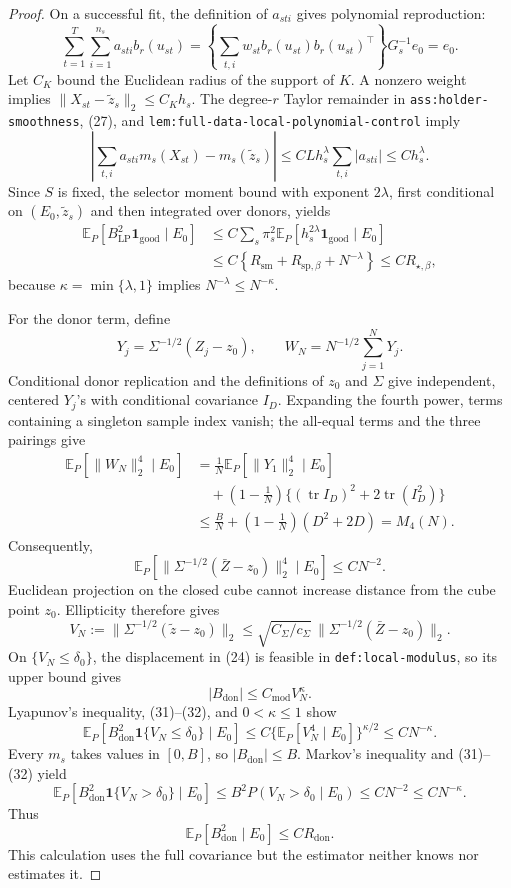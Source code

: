 \documentclass{article}
\begin{document}
\begin{proof}
On a successful fit, the definition of \(a_{sti}\) gives polynomial reproduction:
\[
\sum_{t=1}^{T}\sum_{i=1}^{n_s}a_{sti}b_r(u_{st})
=\left\{\sum_{t,i}w_{st}b_r(u_{st})b_r(u_{st})^\top\right\}G_s^{-1}e_0
=e_0.
\tag{27}
\]
Let \(C_K\) bound the Euclidean radius of the support of \(K\).  A nonzero weight implies
\(\|X_{st}-\widetilde z_s\|_2\leq C_Kh_s\).  The degree-\(r\) Taylor remainder in \texttt{ass:holder-smoothness}, (27), and \texttt{lem:full-data-local-polynomial-control} imply
\[
\left|\sum_{t,i}a_{sti}m_s(X_{st})-m_s(\widetilde z_s)\right|
\leq CLh_s^\lambda\sum_{t,i}|a_{sti}|
\leq Ch_s^\lambda.
\tag{28}
\]
Since \(S\) is fixed, the selector moment bound with exponent \(2\lambda\), first conditional on \((E_0,\widetilde z_s)\) and then integrated over donors, yields
\[
\begin{aligned}
\mathbb E_P[B_{\mathrm{LP}}^2\mathbf1_{\mathrm{good}}\mid E_0]
&\leq C\sum_s\pi_s^2
\mathbb E_P[h_s^{2\lambda}\mathbf1_{\mathrm{good}}\mid E_0]\\
&\leq C\left\{
R_{\mathrm{sm}}+R_{\mathrm{sp},\beta}+N^{-\lambda}\right\}
\leq CR_{\star,\beta},
\end{aligned}
\tag{29}
\]
because \(\kappa=\min\{\lambda,1\}\) implies \(N^{-\lambda}\leq N^{-\kappa}\).

For the donor term, define
\[
Y_j=\Sigma^{-1/2}(Z_j-z_0),
\qquad
W_N=N^{-1/2}\sum_{j=1}^{N}Y_j.
\]
Conditional donor replication and the definitions of \(z_0\) and \(\Sigma\) give independent, centered \(Y_j\)'s with conditional covariance \(I_D\).  Expanding the fourth power, terms containing a singleton sample index vanish; the all-equal terms and the three pairings give
\[
\begin{aligned}
\mathbb E_P[\|W_N\|_2^4\mid E_0]
&=\frac1N\mathbb E_P[\|Y_1\|_2^4\mid E_0]\\
&\quad+\left(1-\frac1N\right)
\{(\operatorname{tr}I_D)^2+2\operatorname{tr}(I_D^2)\}\\
&\leq\frac BN+\left(1-\frac1N\right)(D^2+2D)=M_4(N).
\end{aligned}
\tag{30}
\]
Consequently,
\[
\mathbb E_P[\|\Sigma^{-1/2}(\bar Z-z_0)\|_2^4\mid E_0]
\leq CN^{-2}.
\tag{31}
\]
Euclidean projection on the closed cube cannot increase distance from the cube point \(z_0\).  Ellipticity therefore gives
\[
V_N:=\|\Sigma^{-1/2}(\widetilde z-z_0)\|_2
\leq\sqrt{C_\Sigma/c_\Sigma}\,
\|\Sigma^{-1/2}(\bar Z-z_0)\|_2.
\tag{32}
\]
On \(\{V_N\leq\delta_0\}\), the displacement in (24) is feasible in \texttt{def:local-modulus}, so its upper bound gives
\[
|B_{\mathrm{don}}|\leq C_{\mathrm{mod}}V_N^\kappa.
\]
Lyapunov's inequality, (31)--(32), and \(0<\kappa\leq1\) show
\[
\mathbb E_P[B_{\mathrm{don}}^2\mathbf1\{V_N\leq\delta_0\}\mid E_0]
\leq C\{\mathbb E_P[V_N^4\mid E_0]\}^{\kappa/2}
\leq CN^{-\kappa}.
\tag{33}
\]
Every \(m_s\) takes values in \([0,B]\), so \(|B_{\mathrm{don}}|\leq B\).  Markov's inequality and (31)--(32) yield
\[
\mathbb E_P[B_{\mathrm{don}}^2\mathbf1\{V_N>\delta_0\}\mid E_0]
\leq B^2P(V_N>\delta_0\mid E_0)
\leq CN^{-2}\leq CN^{-\kappa}.
\tag{34}
\]
Thus
\[
\mathbb E_P[B_{\mathrm{don}}^2\mid E_0]\leq CR_{\mathrm{don}}.
\tag{35}
\]
This calculation uses the full covariance but the estimator neither knows nor estimates it.


\end{proof}
\end{document}
